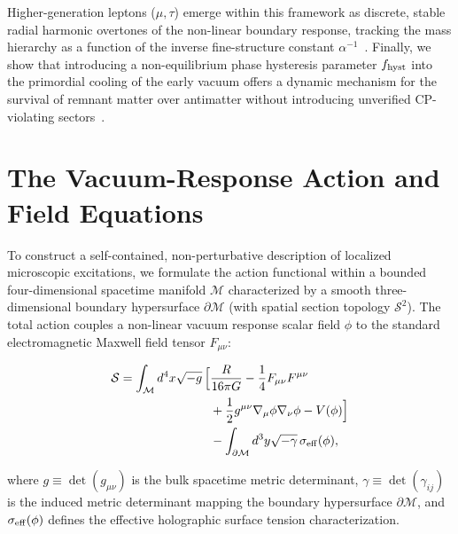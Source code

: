 \documentclass[
  reprint,
  aps,
  prd,
  twocolumn,
  superscriptaddress,
  nofootinbib,
  floatfix
]{revtex4-2}
\begin{document}
Higher-generation leptons ($\mu, \tau$) emerge within this 
framework as discrete, stable radial harmonic overtones of 
the non-linear boundary response, tracking the mass hierarchy 
as a function of the inverse fine-structure constant 
$\alpha^{-1}$~\cite{Koide1982}. Finally, we show that 
introducing a non-equilibrium phase hysteresis parameter 
$f_{\rm hyst}$ into the primordial cooling of the early vacuum 
offers a dynamic mechanism for the survival of remnant matter 
over antimatter without introducing unverified CP-violating 
sectors~\cite{Schwinger1951}.

\section{The Vacuum-Response Action and Field Equations}
\label{sec:action_equations}

To construct a self-contained, non-perturbative description 
of localized microscopic excitations, we formulate the action 
functional within a bounded four-dimensional spacetime manifold 
$\mathcal{M}$ characterized by a smooth three-dimensional 
boundary hypersurface $\partial\mathcal{M}$ (with spatial 
section topology $\mathcal{S}^2$). The total action couples 
a non-linear vacuum response scalar field $\phi$ to the 
standard electromagnetic Maxwell field tensor $F_{\mu\nu}$:


\begin{equation}
\label{eq:lepton_action}
\begin{aligned}
\mathcal{S} = \int_{\mathcal{M}} d^4x \sqrt{-g} \, \Big[
&\frac{R}{16\pi G} - \frac{1}{4} F_{\mu\nu}F^{\mu\nu} \\
&+ \frac{1}{2}g^{\mu\nu}\nabla_\mu\phi\nabla_\nu\phi - V(\phi) \Big] \\
&- \int_{\partial\mathcal{M}} d^3y \sqrt{-%
\gamma} \, \sigma_{\rm eff}(\phi),
\end{aligned}
\end{equation}

where $g \equiv \det(g_{\mu\nu})$ is the bulk spacetime 
metric determinant, $\gamma \equiv \det(\gamma_{ij})$ is the 
induced metric determinant mapping the boundary hypersurface 
$\partial\mathcal{M}$, and $\sigma_{\rm eff}(\phi)$ defines the 
effective holographic surface tension characterization.
\end{document}
